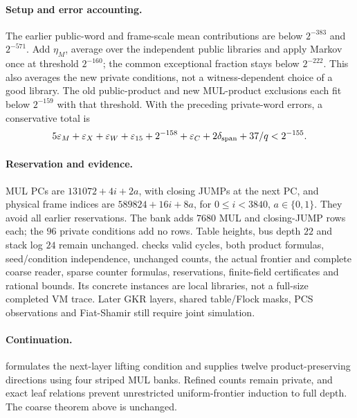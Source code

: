 \paragraph{Setup and error accounting.} The earlier public-word and frame-scale mean contributions are below $2^{-383}$ and $2^{-571}$. Add $\eta_M$, average over the independent public libraries and apply Markov once at threshold $2^{-160}$; the common exceptional fraction stays below $2^{-222}$. This also averages the new private conditions, not a witness-dependent choice of a good library. The old public-product and new MUL-product exclusions each fit below $2^{-159}$ with that threshold. With the preceding private-word errors, a conservative total is
\[
 5\varepsilon_M+\varepsilon_X+\varepsilon_W+\varepsilon_{15}
 +2^{-158}+\varepsilon_C+2\delta_{\rm span}+37/q<2^{-155}.
\]

\paragraph{Reservation and evidence.} MUL PCs are $131072+4i+2a$, with closing JUMPs at the next PC, and physical frame indices are $589824+16i+8a$, for $0\le i<3840$, $a\in\{0,1\}$. They avoid all earlier reservations. The bank adds $7680$ MUL and closing-JUMP rows each; the $96$ private conditions add no rows. Table heights, bus depth $22$ and stack log $24$ remain unchanged.  checks valid cycles, both product formulas, seed/condition independence, unchanged counts, the actual frontier and complete coarse reader, sparse counter formulas, reservations, finite-field certificates and rational bounds. Its concrete instances are local libraries, not a full-size completed VM trace. Later GKR layers, shared table/Flock masks, PCS observations and Fiat-Shamir still require joint simulation.

\paragraph{Continuation.}  formulates the next-layer lifting condition and supplies twelve product-preserving directions using four striped MUL banks. Refined counts remain private, and exact leaf relations prevent unrestricted uniform-frontier induction to full depth. The coarse theorem above is unchanged.
